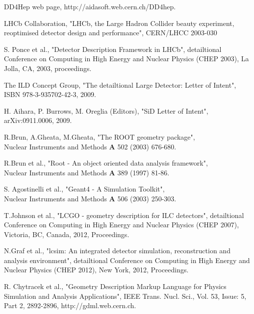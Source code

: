   DD4Hep web page, http://aidasoft.web.cern.ch/DD4hep.

 		LHCb Collaboration, 
                "LHCb, the Large Hadron Collider beauty experiment, reoptimised detector 
				design and performance", CERN/LHCC 2003-030

 S. Ponce et al., 
                "Detector Description Framework in LHCb", 
                detailtional Conference on Computing in High Energy and Nuclear Physics  (CHEP 2003), 
                La Jolla, CA, 2003, proceedings. 

  The ILD Concept Group, 
                   "The detailtional Large Detector: Letter of Intent",\\
                   ISBN 978-3-935702-42-3, 2009.

  H. Aihara, P. Burrows, M. Oreglia (Editors),
                   "SiD Letter of Intent",
                   arXiv:0911.0006, 2009.

 R.Brun, A.Gheata, M.Gheata, "The ROOT geometry package",\\
                    Nuclear Instruments and Methods {\bf{A}} 502 (2003) 676-680.

 R.Brun et al., 
                   "Root - An object oriented data analysis framework",\\
                    Nuclear Instruments and Methods {\bf{A}} 389 (1997) 81-86.

  S. Agostinelli et al., 
                   "Geant4 - A Simulation Toolkit", \\
                    Nuclear Instruments and Methods {\bf{A}} 506 (2003) 250-303.

 T.Johnson et al., 
                   "LCGO - geometry description for ILC detectors", 
                   detailtional Conference on Computing in High Energy and Nuclear Physics  (CHEP 2007), 
                   Victoria, BC, Canada, 2012, Proceedings.

 N.Graf et al., 
                   "lcsim: An integrated detector simulation, 
                   reconstruction and analysis environment", 
                   detailtional Conference on Computing in High Energy and Nuclear Physics (CHEP 2012),
                   New York, 2012, Proceedings.

 R. Chytracek et al.,
                   "Geometry Description Markup Language for Physics Simulation and Analysis
                   Applications",
                   IEEE Trans. Nucl. Sci., Vol. 53, Issue: 5, Part 2, 2892-2896,
                   http://gdml.web.cern.ch.
